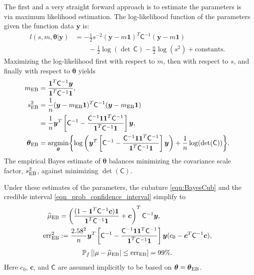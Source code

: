 \documentclass{iitthesis}          %
\newcommand{\bm}[1]{\boldsymbol{#1}}
\newcommand{\vtheta}{{\bm{\theta}}}
\newcommand{\vc}{\bm{c}}
\newcommand{\vy}{\bm{y}}
\newcommand{\vone}{\bm{1}}
\newcommand{\mC}{\mathsf{C}}
\newcommand{\mCInv}{{\mathsf{C}^{-1}}}
\newcommand{\hmu}{\widehat{\mu}}
\newcommand{\MLE}{\textup{EB}}
\newcommand{\err}{\textup{err}}
\providecommand{\argmin}{\operatorname*{argmin}}
\begin{document}
  \label{sec:MLE}

The first and a very straight forward approach is to estimate the parameters is via maximum likelihood estimation.  The log-likelihood function of the parameters given the function data $\vy$ is:
\begin{align*}
l(s,m,\vtheta | \vy)
&= -\frac{1}{2} s^{-2} (\vy-m\vone)^T\mCInv(\vy-m\vone) 
\\ & \qquad
 - \frac{1}{2} \log(\det\, \mC) - \frac{n}{2} \log(s^2) + \text{constants.}
\end{align*}
Maximizing the log-likelihood first with respect to $m$, then with respect to $s$, and finally with respect to $\vtheta$ yields
\begin{align*}
m_\MLE &= \frac{\vone^T \mCInv \vy }{ \vone^T \mCInv \vone}, \\
\nonumber
s^2_{\MLE}  
&= \frac{1}{n} (\vy-m_{\MLE}\vone)^T\mCInv(\vy-m_{\MLE}\vone) 
\\
&= 
\frac{1}{n}
\vy^T 
\left[ 
\mCInv - 
\frac{ \mCInv \vone \vone^T \mCInv }{\vone^T\mCInv \vone}
\right] \vy, \\
\vtheta_\MLE
&= \argmin_{\vtheta} \biggl \{
\log\left(\vy^T 
\left[ \mCInv - 
\frac{ \mCInv \vone \vone^T \mCInv }{\vone^T\mCInv \vone}
\right] \vy 
\right)  +  \frac{1}{n} \log(\det(\mC))
\biggr \}.
\end{align*}
The empirical Bayes estimate of $\vtheta$ balances minimizing the covariance scale factor, $s^2_{\MLE}$, against minimizing  $\det(\mC)$. 

Under these estimates of the parameters, the cubature \eqref{eqn:BayesCub} and the credible interval \eqref{eqn_prob_confidence_interval} simplify to 
\begin{align*} %
\hmu_\MLE  &= 
\left(
\frac{ (1 - \vone^T  \mCInv\vc )  \vone }{ \vone^T \mCInv \vone}   +  \vc 
\right)^T  \mCInv \vy, \\
\err_\MLE^2 & : = \frac{2.58^2}{n}
 \vy^T \left[ \mCInv - 
\frac{ \mCInv \vone \vone^T \mCInv }{\vone^T\mCInv \vone}
\right] \vy  
(c_0 - \vc^T\mC^{-1}\vc ),
\end{align*}
\begin{align}
\label{eqn_prob_CI_MLE}
\mathbb{P}_f \left[
|\mu-\hmu_\MLE| \leq \err_\MLE \right]  = 99\%.
\end{align}
Here $c_0$, $\vc$, and $\mC$ are assumed implicitly to be based on $\vtheta = \vtheta_\MLE$.   
\end{document}
